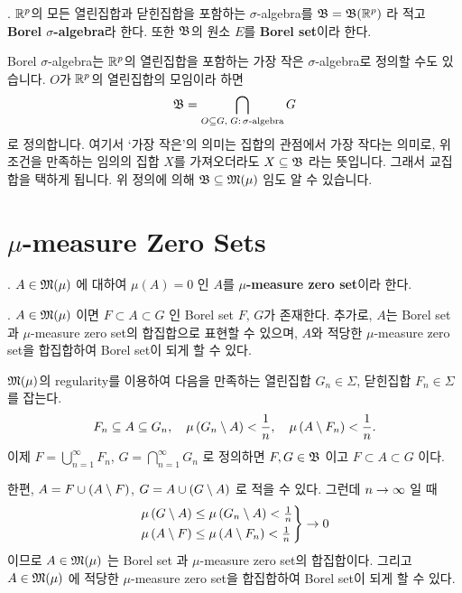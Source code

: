 .  \(\mathbb{R}^p\)의 모든 열린집합과 닫힌집합을 포함하는 \(\sigma\)-algebra를 \(\mathfrak{B} = \mathfrak{B}(\mathbb{R}^p)\) 라 적고 \textbf{Borel \(\sigma\)-algebra}라 한다. 또한 \(\mathfrak{B}\)의 원소 \(E\)를 \textbf{Borel set}이라 한다.

Borel \(\sigma\)-algebra는 \(\mathbb{R}^p\)의 열린집합을 포함하는 가장 작은 \(\sigma\)-algebra로 정의할 수도 있습니다. \(O\)가 \(\mathbb{R}^p\)의 열린집합의 모임이라 하면
\[
    \mathfrak{B} = \bigcap_{O \subseteq G,\;G:\, \sigma\text{-algebra}} G
\]
로 정의합니다. 여기서 `가장 작은'의 의미는 집합의 관점에서 가장 작다는 의미로, 위 조건을 만족하는 임의의 집합 \(X\)를 가져오더라도 \(X \subseteq \mathfrak{B}\) 라는 뜻입니다. 그래서 교집합을 택하게 됩니다. 위 정의에 의해 \(\mathfrak{B} \subseteq \mathfrak{M}(\mu)\) 임도 알 수 있습니다.

\section*{\(\mu\)-measure Zero Sets}

.  \(A \in \mathfrak{M}(\mu)\) 에 대하여 \(\mu(A) = 0\) 인 \(A\)를 \textbf{\(\mu\)-measure zero set}이라 한다.

\prop. \(A \in \mathfrak{M}(\mu)\) 이면 \(F \subset A \subset G\) 인 Borel set \(F\), \(G\)가 존재한다. 추가로, \(A\)는 Borel set과 \(\mu\)-measure zero set의 합집합으로 표현할 수 있으며, \(A\)와 적당한 \(\mu\)-measure zero set을 합집합하여 Borel set이 되게 할 수 있다.

\pf \(\mathfrak{M}(\mu)\)의 regularity를 이용하여 다음을 만족하는 열린집합 \(G_n \in \Sigma\), 닫힌집합 \(F_n \in \Sigma\) 를 잡는다.
\[
    F_n \subseteq A \subseteq G_n, \quad \mu\left( G_n \setminus A \right) < \frac{1}{n}, \quad \mu\left( A \setminus F_n \right) < \frac{1}{n}.
\]
이제 \(F = \bigcup_{n=1}^{\infty} F_n\), \(G = \bigcap_{n=1}^{\infty} G_n\) 로 정의하면 \(F, G \in \mathfrak{B}\) 이고 \(F \subset A \subset G\) 이다.

한편, \(A = F \cup (A \setminus F)\), \(G = A \cup (G \setminus A)\) 로 적을 수 있다. 그런데 \(n \rightarrow \infty\) 일 때
\[
    \begin{rcases}
        \mu\left( G \setminus A \right)\leq \mu\left( G_n \setminus A \right) < \frac{1}{n} \\
        \mu\left( A \setminus F \right) \leq \mu\left( A \setminus F_n \right) < \frac{1}{n}
    \end{rcases} \rightarrow 0
\]
이므로 \(A \in \mathfrak{M}(\mu)\) 는 Borel set 과 \(\mu\)-measure zero set의 합집합이다. 그리고 \(A \in \mathfrak{M}(\mu)\) 에 적당한 \(\mu\)-measure zero set을 합집합하여 Borel set이 되게 할 수 있다.

